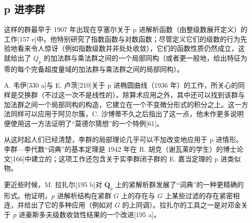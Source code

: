 \subsection{p 进李群}

这样的群最早于 1907 年出现在亨塞尔关于 p 进解析函数（由整级数展开定义）的工作{[}157 e{]}中。他特别研究了指数函数与对数函数；尽管定义它们的级数的行为先验地看来令人惊讶（例如指数级数并非处处收敛），它们的函数性质仍然成立，这就给出了 \(Q_{p}\) 的加法群与乘法群之间的一个局部同构（或者更一般地，给出特征为零的每个完备超度量域的加法群与乘法群之间的局部同构）。

A. 韦伊{[}330 a{]}与 E. 卢茨{[}210{]}关于 p 进椭圆曲线（1936 年）的工作，所关心的同样是交换群（不过这一次不是线性的）。除算术应用之外，其中还可以找到该群与加法群之间一个局部同构的构造，它建立在一个不变微分形式的积分之上。这一方法同样可以应用于阿贝尔簇，C. 沙博蒂不久之后指出了这一点，他未作更多说明便使用这一方法证明了“莫德尔猜想”的一个特例{[}61{]}。

从这时起人们已经清楚，李群的局部理论几乎可以不加改变地应用于 p 进情形。李群—李代数“词典”的基本定理是 1942 年在 R. 胡克（谢瓦莱的学生）的博士论文{[}166{]}中建立的；这项工作还包含关于实李群闭子群的 E. 嘉当定理的 p 进类似物。

更近些时候，M. 拉扎尔{[}195 b{]}对 \(\mathbf{Q}_p\) 上的紧解析群发展了“词典”的一种更精确的形式。他证明，\(p\) 进解析结构在紧群 \(G\) 上的存在与 \(G\) 上某些过滤的存在紧密相连，并给出了它的多种应用（例如对 \(G\) 的上同调）。拉扎尔的工具之一是对邓金关于 \(p\) 进豪斯多夫级数收敛性结果的一个改进{[}195 a{]}。

